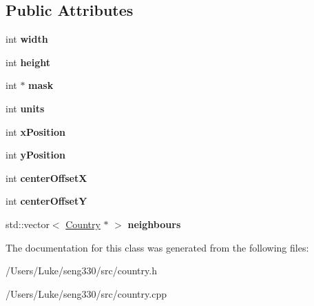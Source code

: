 \subsection*{Public Attributes}
\begin{DoxyCompactItemize}
\item 
\hypertarget{class_country_ae90178765039aaae29842ca0ee6ebc30}{}int {\bfseries width}\label{class_country_ae90178765039aaae29842ca0ee6ebc30}

\item 
\hypertarget{class_country_a55c1021eef0ff5cc1daec9c31a748c4d}{}int {\bfseries height}\label{class_country_a55c1021eef0ff5cc1daec9c31a748c4d}

\item 
\hypertarget{class_country_a1e7186cec8281a3604313f2845a71b17}{}int $\ast$ {\bfseries mask}\label{class_country_a1e7186cec8281a3604313f2845a71b17}

\item 
\hypertarget{class_country_ac3ee5c3090877ee84fb984df87f540be}{}int {\bfseries units}\label{class_country_ac3ee5c3090877ee84fb984df87f540be}

\item 
\hypertarget{class_country_a703bce2a180c94e1cff77cab4459561e}{}int {\bfseries x\+Position}\label{class_country_a703bce2a180c94e1cff77cab4459561e}

\item 
\hypertarget{class_country_a3aff6dfc79e7c80a9359338eb5b14f57}{}int {\bfseries y\+Position}\label{class_country_a3aff6dfc79e7c80a9359338eb5b14f57}

\item 
\hypertarget{class_country_a7ea772dda1645e6ee126bb6b4e638e2a}{}int {\bfseries center\+Offset\+X}\label{class_country_a7ea772dda1645e6ee126bb6b4e638e2a}

\item 
\hypertarget{class_country_a9f316f761a06a63eb3ce53ce735b8103}{}int {\bfseries center\+Offset\+Y}\label{class_country_a9f316f761a06a63eb3ce53ce735b8103}

\item 
\hypertarget{class_country_aeb2d8381be714e12a4c2fecbd1336400}{}std\+::vector$<$ \hyperlink{class_country}{Country} $\ast$ $>$ {\bfseries neighbours}\label{class_country_aeb2d8381be714e12a4c2fecbd1336400}

\end{DoxyCompactItemize}


The documentation for this class was generated from the following files\+:\begin{DoxyCompactItemize}
\item 
/\+Users/\+Luke/seng330/src/country.\+h\item 
/\+Users/\+Luke/seng330/src/country.\+cpp\end{DoxyCompactItemize}
